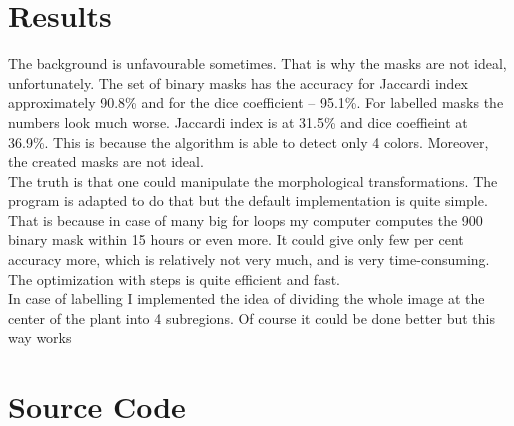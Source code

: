 \documentclass[12pt]{article}
\begin{document}
\section{Results}
The background is unfavourable sometimes. That is why the masks are not ideal, unfortunately. The set of binary masks has the accuracy for Jaccardi index approximately 90.8\% and for the dice coefficient – 95.1\%. For labelled masks the numbers look much worse. Jaccardi index is at 31.5\% and dice coeffieint at 36.9\%.  This is because the algorithm is able to detect only 4 colors. Moreover, the created masks are not ideal.\\
The truth is that one could manipulate the morphological transformations. The program is adapted to do that but the default implementation is quite simple. That is because in case of many big for loops my computer computes the 900 binary mask within 15 hours or even more. It could give only few per cent accuracy more, which is relatively not very much, and is very time-consuming. The optimization with steps is quite efficient and fast.\\
In case of labelling I implemented the idea of dividing the whole image at the center of the plant into 4 subregions. Of course it could be done better but this way works


\section{Source Code}
\end{document}
